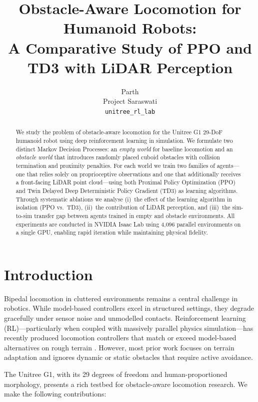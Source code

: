 \documentclass{article}
\title{Obstacle-Aware Locomotion for Humanoid Robots:\\
       A Comparative Study of PPO and TD3 with LiDAR Perception}
\author{
  Parth \\
  Project Saraswati \\
  \texttt{unitree\_rl\_lab}
}
\begin{document}
\maketitle

\begin{abstract}
We study the problem of obstacle-aware locomotion for the Unitree G1 29-DoF
humanoid robot using deep reinforcement learning in simulation.
We formulate two distinct Markov Decision Processes: an \emph{empty world} for
baseline locomotion and an \emph{obstacle world} that introduces randomly
placed cuboid obstacles with collision termination and proximity penalties.
For each world we train two families of agents—one that relies solely on
proprioceptive observations and one that additionally receives a front-facing
LiDAR point cloud—using both Proximal Policy Optimization (PPO) and Twin
Delayed Deep Deterministic Policy Gradient (TD3) as learning algorithms.
Through systematic ablations we analyse (i)~the effect of the learning
algorithm in isolation (PPO vs.\ TD3), (ii)~the contribution of LiDAR
perception, and (iii)~the sim-to-sim transfer gap between agents trained in
empty and obstacle environments.
All experiments are conducted in NVIDIA Isaac Lab using 4{,}096 parallel
environments on a single GPU, enabling rapid iteration while maintaining
physical fidelity.
\end{abstract}

\section{Introduction}

Bipedal locomotion in cluttered environments remains a central challenge in
robotics.
While model-based controllers excel in structured settings, they degrade
gracefully under sensor noise and unmodelled contacts.
Reinforcement learning (RL)—particularly when coupled with massively parallel
physics simulation—has recently produced locomotion controllers that match or
exceed model-based alternatives on rough terrain
\cite{lee2020learning,kumar2021rma,margolis2022rapid}.
However, most prior work focuses on terrain adaptation and ignores dynamic or
static obstacles that require active avoidance.

The Unitree G1, with its 29 degrees of freedom and human-proportioned
morphology, presents a rich testbed for obstacle-aware locomotion research.
We make the following contributions:
\end{document}
